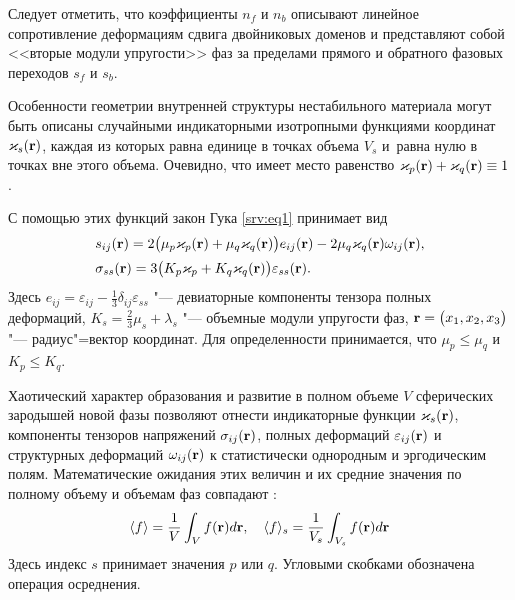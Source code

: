 Следует отметить, что коэффициенты $n_f$ и $n_b$ описывают линейное сопротивление деформациям сдвига двойниковых доменов и представляют собой <<вторые модули упругости>> фаз за пределами прямого и обратного фазовых переходов $s_f$ и $s_b$.

Особенности геометрии внутренней структуры нестабильного материала могут быть описаны случайными индикаторными изотропными функциями координат $\varkappa_{s}(\bold{r})$, каждая из которых равна единице в точках объема  $V_{s}$ и~равна нулю в точках вне этого объема. Очевидно, что имеет место равенство 
$\varkappa_{p}(\bold{r})+\varkappa_{q}(\bold{r}) \equiv 1$.

С помощью этих функций закон Гука \eqref{srv:eq1} принимает вид
\begin{equation}\label{srv:eq3}
\begin{array}{ll}
s_{ij}(\bold{r})=2\big (\mu_p\varkappa_p (\bold{r})+\mu_q \varkappa_{q} (\bold{r}) \big) e_{ij}(\bold{r})-2 \mu_{q} \varkappa_{q}(\bold{r})\omega_{ij}(\bold{r}), \\[2mm]
\sigma_{ss}(\bold{r})=3 \big(K_{p} \varkappa_{p}+K_{q} \varkappa_{q}(\bold{r}) \big) \varepsilon_{ss}(\bold{r}).
\end{array}
\end{equation}
Здесь $e_{ij}=\varepsilon_{ij}-\frac{1}{3} \delta_{ij} \varepsilon_{ss}$ "--- девиаторные компоненты тензора полных деформаций,  $K_{s}=\frac{2}{3} \mu_{s}+\lambda_{s}$ "--- объемные модули упругости фаз,  $\bold{r}=\big(x_1,x_2,x_3 \big)$ "--- радиус"=вектор координат. 
Для определенности принимается, что $\mu_{p} \leq \mu_{q}$  и~$K_{p} \leq K_{q}$.

Хаотический характер образования и развитие в полном объеме $V$ сферических зародышей новой фазы позволяют отнести индикаторные функции $\varkappa_{s}(\bold{r})$, компоненты тензоров напряжений $\sigma_{ij}(\bold{r})$, полных деформаций $\varepsilon_{ij}(\bold{r})$ и структурных деформаций $\omega_{ij}(\bold{r})$ к статистически однородным и эргодическим полям. Математические ожидания этих величин и их средние значения по полному объему  и объемам фаз совпадают \cite{Saraev2017}:
\[
 \langle  {f}  \rangle =\frac{1}{V}\int _V f(\bold{r}) d\bold{r}, \quad  
 \langle  {f}  \rangle _{s}=\frac{1}{V_{s}}\int _{V_{s}} f(\bold{r}) d\bold{r}
\]
Здесь индекс $s$ принимает значения $p$ или $q$. Угловыми скобками обозначена операция осреднения.

